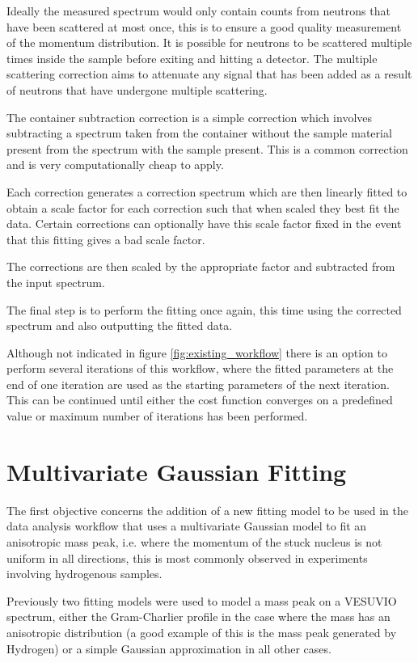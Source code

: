 \documentclass[a4paper]{article}
\begin{document}
Ideally the measured spectrum would only contain counts from neutrons that have
been scattered at most once, this is to ensure a good quality measurement of the
momentum distribution. It is possible for neutrons to be scattered multiple
times inside the sample before exiting and hitting a detector. The multiple
scattering correction aims to attenuate any signal that has been added as a
result of neutrons that have undergone multiple scattering.

The container subtraction correction is a simple correction which involves
subtracting a spectrum taken from the container without the sample material
present from the spectrum with the sample present. This is a common correction
and is very computationally cheap to apply.

Each correction generates a correction spectrum which are then linearly fitted
to obtain a scale factor for each correction such that when scaled they best
fit the data. Certain corrections can optionally have this scale factor fixed in
the event that this fitting gives a bad scale factor.

The corrections are then scaled by the appropriate factor and subtracted from
the input spectrum.

The final step is to perform the fitting once again, this time using the
corrected spectrum and also outputting the fitted data.

Although not indicated in figure \ref{fig:existing_workflow} there is an option
to perform several iterations of this workflow, where the fitted parameters at
the end of one iteration are used as the starting parameters of the next
iteration. This can be continued until either the cost function converges on a
predefined value or  maximum number of iterations has been performed.

\section{Multivariate Gaussian Fitting}
\label{sec:multivariate_gaussian_fitting}

The first objective concerns the addition of a new fitting model to be used in
the data analysis workflow that uses a multivariate Gaussian model to fit an
anisotropic mass peak, i.e. where the momentum of the stuck nucleus is not
uniform in all directions, this is most commonly observed in experiments
involving hydrogenous samples.

Previously two fitting models were used to model a mass peak on a VESUVIO
spectrum, either the Gram-Charlier profile in the case where the mass has an
anisotropic distribution (a good example of this is the mass peak generated by
Hydrogen) or a simple Gaussian approximation in all other cases.
\end{document}
